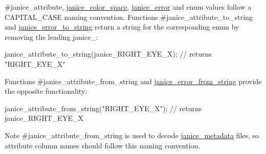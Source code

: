 \#janice\+\_\+attribute, \hyperlink{group__janice_ga2bbe1c8abfa34a1fdc1cc88b6c833715}{janice\+\_\+color\+\_\+space}, \hyperlink{group__janice_gac9071fe2c752efef60aa3f932a290fda}{janice\+\_\+error} and enum values follow a {\ttfamily C\+A\+P\+I\+T\+A\+L\+\_\+\+C\+A\+S\+E} naming convention. Functions \#janice\+\_\+attribute\+\_\+to\+\_\+string and \hyperlink{group__janice__io_gaab03ac29fa90f0807739c6eecb82cf63}{janice\+\_\+error\+\_\+to\+\_\+string} return a string for the corresponding enum by removing the leading {\ttfamily janice\+\_\+\+:} 
\begin{DoxyCode}
janice\_attribute\_to\_string(janice\_RIGHT\_EYE\_X); \textcolor{comment}{// returns "RIGHT\_EYE\_X"}
\end{DoxyCode}
 Functions \#janice\+\_\+attribute\+\_\+from\+\_\+string and \hyperlink{group__janice__io_ga68c2c0091b2ca233b94197a50760c328}{janice\+\_\+error\+\_\+from\+\_\+string} provide the opposite functionality\+: 
\begin{DoxyCode}
janice\_attribute\_from\_string(\textcolor{stringliteral}{"RIGHT\_EYE\_X"}); \textcolor{comment}{// returns janice\_RIGHT\_EYE\_X}
\end{DoxyCode}
 \begin{DoxyNote}{Note}
\#janice\+\_\+attribute\+\_\+from\+\_\+string is used to decode \hyperlink{group__janice__io_ga98fb8d1945016f13408aa772de4c3e64}{janice\+\_\+metadata} files, so attribute column names should follow this naming convention. 
\end{DoxyNote}
